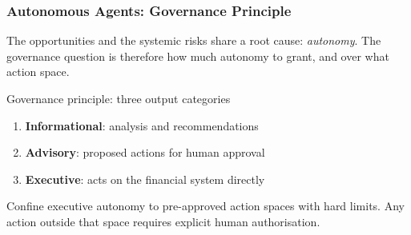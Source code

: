 \documentclass[9pt,t]{beamer}
\begin{document}
\begin{frame}
\frametitle{Autonomous Agents: Governance Principle}

The opportunities and the systemic risks share a root cause: \emph{autonomy}.
The governance question is therefore how much autonomy to grant, and over what
action space.

\medskip
\begin{block}{Governance principle: three output categories}
  \begin{enumerate}
    \item \textbf{Informational}: analysis and recommendations
    \item \textbf{Advisory}: proposed actions for human approval
    \item \textbf{Executive}: acts on the financial system directly
  \end{enumerate}
  Confine executive autonomy to pre-approved action spaces with hard limits. Any action outside that space requires explicit human authorisation.
\end{block}
\end{frame}
\end{document}
